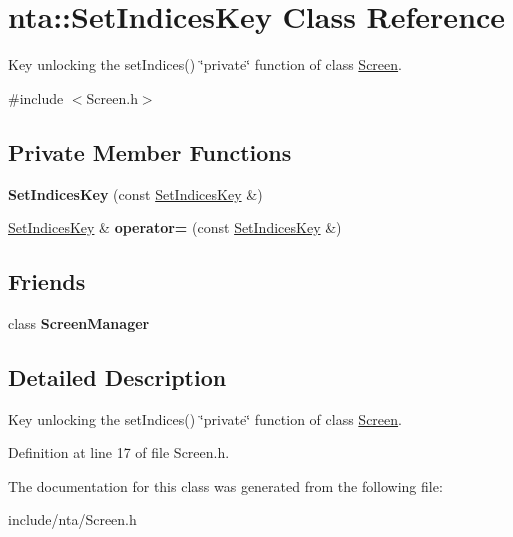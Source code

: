 \hypertarget{classnta_1_1SetIndicesKey}{}\section{nta\+:\+:Set\+Indices\+Key Class Reference}
\label{classnta_1_1SetIndicesKey}


Key unlocking the set\+Indices() \char`\"{}private\char`\"{} function of class \hyperlink{classnta_1_1Screen}{Screen}.  




{\ttfamily \#include $<$Screen.\+h$>$}

\subsection*{Private Member Functions}
\begin{DoxyCompactItemize}
\item 
\mbox{\label{classnta_1_1SetIndicesKey_a1b4bf4c2c1cedda8165b75fc9647943b}} 
{\bfseries Set\+Indices\+Key} (const \hyperlink{classnta_1_1SetIndicesKey}{Set\+Indices\+Key} \&)
\item 
\mbox{\label{classnta_1_1SetIndicesKey_adef93d7ba4e08efef31699a128c1f6cc}} 
\hyperlink{classnta_1_1SetIndicesKey}{Set\+Indices\+Key} \& {\bfseries operator=} (const \hyperlink{classnta_1_1SetIndicesKey}{Set\+Indices\+Key} \&)
\end{DoxyCompactItemize}
\subsection*{Friends}
\begin{DoxyCompactItemize}
\item 
\mbox{\label{classnta_1_1SetIndicesKey_a888edc649fed896d28811ec69f3f2066}} 
class {\bfseries Screen\+Manager}
\end{DoxyCompactItemize}


\subsection{Detailed Description}
Key unlocking the set\+Indices() \char`\"{}private\char`\"{} function of class \hyperlink{classnta_1_1Screen}{Screen}. 

Definition at line 17 of file Screen.\+h.



The documentation for this class was generated from the following file\+:\begin{DoxyCompactItemize}
\item 
include/nta/Screen.\+h\end{DoxyCompactItemize}
